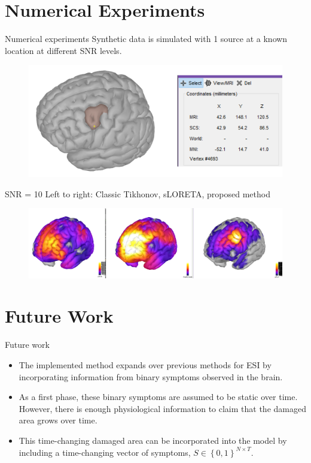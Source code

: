\documentclass[progressbar=head]{beamer}
\newcommand{\set}[1]{ \left\{ #1 \right\} }
\begin{document}
{
\section{Numerical Experiments}
}

\begin{frame}{Numerical experiments}
Synthetic data is simulated with 1 source at  a known location at different SNR levels. 
\begin{figure}
\centering
\includegraphics[width=0.8\linewidth]{./img_oldbeamer/protocol1}
\end{figure}
\end{frame}

\begin{frame}{SNR = 10}
Left to right: Classic Tikhonov, sLORETA, proposed method
\begin{figure}
\centering
\includegraphics[width=1\linewidth]{./img_oldbeamer/comparison1}
\end{figure}
\end{frame}


{
\section{Future Work}
}

\begin{frame}{Future work}
\begin{itemize}
    \item The implemented method expands over previous methods for ESI by incorporating information from binary symptoms observed in the brain.
    \item As a first phase, these binary symptoms are assumed to be static over time. However, there is enough physiological information to claim that the damaged area grows over time.
    \item This time-changing damaged area can be incorporated into the model by including a time-changing vector of symptoms, ${S\in \set{0,1}^{N\times T}}$.
\end{itemize}
\end{frame}
\end{document}
